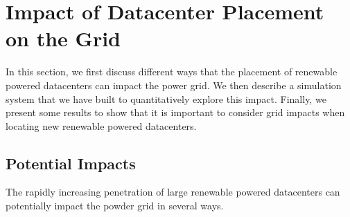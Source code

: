 \section{Impact of Datacenter Placement on the Grid}
\label{sec:quantify}

In this section, we first discuss different ways that the placement of renewable powered datacenters can impact the power grid.  We then describe a simulation system that we have built to quantitatively explore this impact.  Finally, we present some results to show that it is important to consider grid impacts when locating new renewable powered datacenters.


\subsection{Potential Impacts}

The rapidly increasing penetration of large renewable powered datacenters can potentially impact the powder grid in several ways.

